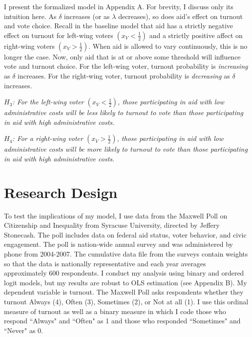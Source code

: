 \documentclass[12pt]{paper}
\begin{document}
I present the formalized model in Appendix A. For brevity, I discuss only its intuition here. As $\delta$ increases (or as $\lambda$ decreases), so does aid's effect on turnout and vote choice. Recall in the baseline model that aid has a strictly negative effect on turnout for left-wing voters $(x_V < \frac{1}{2})$ and a strictly positive affect on right-wing voters $(x_V > \frac{1}{2})$. When aid is allowed to vary continuously, this is no longer the case. Now, only aid that is at or above some threshold will influence vote and turnout choice. For the left-wing voter, turnout probability is \textit{increasing} as $\delta$ increases. For the right-wing voter, turnout probability is \textit{decreasing} as $\delta$ increases.

\textit{$H_3$: For the left-wing voter $(x_V < \frac{1}{2})$, those participating in aid with low administrative costs will be less likely to turnout to vote than those participating in aid with high administrative costs.}

\textit{$H_4$: For a right-wing voter $(x_V > \frac{1}{2})$, those participating in aid with low administrative costs will be more likely to turnout to vote than those participating in aid with high administrative costs.}

\section{Research Design}
To test the implications of my model, I use data from the Maxwell Poll on Citizenship and Inequality from Syracuse University, directed by Jeffery Stonecash. The poll includes data on federal aid status, voter behavior, and civic engagement. The poll is nation-wide annual survey and was administered by phone from 2004-2007. The cumulative data file from the surveys contain weights so that the data is nationally representative and each year averages approximately 600 respondents. I conduct my analysis using binary and ordered logit models, but my results are robust to OLS estimation (see Appendix B). My dependent variable is turnout. The Maxwell Poll asks respondents whether they turnout Always (4), Often (3), Sometimes (2), or Not at all (1). I use this ordinal measure of turnout as well as a binary measure in which I code those who respond ``Always" and ``Often" as 1 and those who responded ``Sometimes" and ``Never" as 0.
\end{document}
